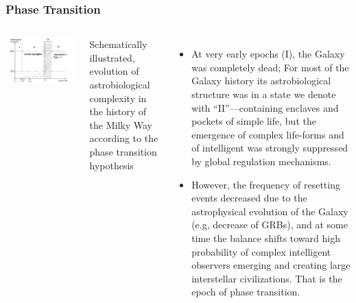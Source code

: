 \begin{frame}
\frametitle{ Phase Transition}

\begin{columns}
\includegraphics[scale=0.46]{phasetransition}

Schematically illustrated,
evolution of astrobiological complexity
in the history of the Milky
Way according to the phase transition
hypothesis
\begin{itemize}

\item  At very early epochs (I), the Galaxy was completely dead;  For most of the Galaxy history its astrobiological
structure was in a state we denote with “II”—containing enclaves and pockets of simple life,
but the emergence of complex life-forms and of intelligent was strongly suppressed by global regulation mechanisms. 

\item However, the frequency of resetting events decreased due to the astrophysical evolution of the
Galaxy (e.g, decrease of GRBs), and at some time  the balance shifts toward
high probability of complex intelligent observers emerging and creating large interstellar
civilizations. That is the epoch of phase transition. 

\end{itemize}

\end{columns}

\end{frame}


